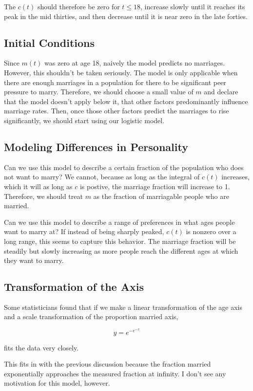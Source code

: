\documentclass{article}
\begin{document}
The $c(t)$ should therefore be zero for $t \leq 18$,
	increase slowly until it reaches its peak in the mid
	thirties, and then decrease until it is near zero
	in the late forties.

\subsection{Initial Conditions}

Since $m(t)$ was zero at age 18, naively the model predicts
	no marriages.
However, this shouldn't be taken seriously.
The model is only applicable when there are enough marriages
	in a population for there to be significant peer pressure
	to marry.
Therefore, we should choose a small value of $m$ and declare
	that the model doesn't apply below it, that other
	factors predominantly influence marriage rates.
Then, once those other factors predict the marriages to rise
	significantly, we should start using our logistic model.

\subsection{Modeling Differences in Personality}

Can we use this model to describe a certain fraction of the population
	who does not want to marry?
We cannot, because as long as the integral of $c(t)$ increases,
	which it will as long as $c$ is postive,
	the marriage fraction will increase to 1.
Therefore, we should treat $m$ as the fraction of marriagable people
	who are married.

Can we use this model to describe a range of preferences in what ages
	people want to marry at?
If instead of being sharply peaked, $c(t)$ is nonzero over a long range,
	this seems to capture this behavior.
The marriage fraction will be steadily but slowly increasing as more people
	reach the different ages at which they want to marry.

\subsection{Transformation of the Axis}

Some statisticians found that if we make a linear transformation of the age axis
	and a scale transformation of the proportion married axis,

\[ y = e^{-e^{-x}} \]

fits the data very closely.

This fits in with the previous discussion because the fraction married
	exponentially approaches the measured fraction at infinity.
I don't see any motivation for this model, however.
\end{document}
